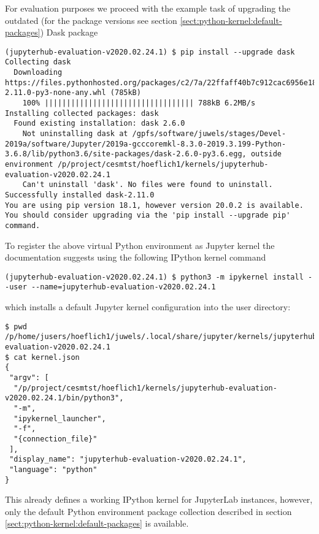 \documentclass[11pt,a4paper]{article}
\begin{document}
For evaluation purposes we proceed with the example task of upgrading the outdated (for the package versions see section \ref{sect:python-kernel:default-packages}) Dask package
%
\begin{verbatim}
(jupyterhub-evaluation-v2020.02.24.1) $ pip install --upgrade dask
Collecting dask
  Downloading https://files.pythonhosted.org/packages/c2/7a/22ffaff40b7c912cac6956e18d38c686b6b5756179e9c09e8e6bf7810aad/dask-2.11.0-py3-none-any.whl (785kB)
    100% |||||||||||||||||||||||||||||||||| 788kB 6.2MB/s
Installing collected packages: dask
  Found existing installation: dask 2.6.0
    Not uninstalling dask at /gpfs/software/juwels/stages/Devel-2019a/software/Jupyter/2019a-gcccoremkl-8.3.0-2019.3.199-Python-3.6.8/lib/python3.6/site-packages/dask-2.6.0-py3.6.egg, outside environment /p/project/cesmtst/hoeflich1/kernels/jupyterhub-evaluation-v2020.02.24.1
    Can't uninstall 'dask'. No files were found to uninstall.
Successfully installed dask-2.11.0
You are using pip version 18.1, however version 20.0.2 is available.
You should consider upgrading via the 'pip install --upgrade pip' command.
\end{verbatim}

To register the above virtual Python environment as Jupyter kernel the documentation suggests using the following IPython kernel command
%
\begin{verbatim}
(jupyterhub-evaluation-v2020.02.24.1) $ python3 -m ipykernel install --user --name=jupyterhub-evaluation-v2020.02.24.1
\end{verbatim}
%
which installs a default Jupyter kernel configuration into the user directory:
%
\begin{verbatim}
$ pwd
/p/home/jusers/hoeflich1/juwels/.local/share/jupyter/kernels/jupyterhub-evaluation-v2020.02.24.1
$ cat kernel.json
{
 "argv": [
  "/p/project/cesmtst/hoeflich1/kernels/jupyterhub-evaluation-v2020.02.24.1/bin/python3",
  "-m",
  "ipykernel_launcher",
  "-f",
  "{connection_file}"
 ],
 "display_name": "jupyterhub-evaluation-v2020.02.24.1",
 "language": "python"
}
\end{verbatim}

This already defines a working IPython kernel for JupyterLab instances, however, only the default Python environment package collection described in section \ref{sect:python-kernel:default-packages} is available.
\end{document}
